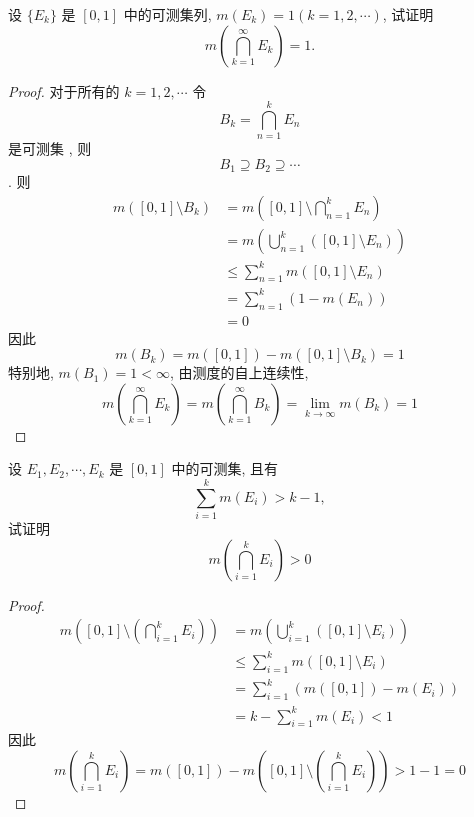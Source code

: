 \documentclass[../main.tex]{subfiles}
\begin{document}
\begin{exercise}{}{}
设 $\{E_k\}$ 是 $[0,1]$ 中的可测集列, $m(E_k)=1 (k=1,2,\cdots)$, 试证明
\[m\left(\bigcap_{k=1}^{\infty} E_k\right) = 1.\]
\end{exercise}
\begin{proof}
   对于所有的 \(  k= 1,2,\cdots   \)  令 \[
    B_{k}= \bigcap _{n = 1}^{k}E_{n}
    \]是可测集 , 则 \[
    B_{1}\supseteq B_2\supseteq \cdots 
    \]. 则 \[
   \begin{aligned}
    m\left( \left[ 0,1 \right]\setminus B_{k}  \right)&= m\left( \left[ 0,1 \right]\setminus \bigcap _{n = 1}^{k}E_{n}  \right)\\ 
     &= m\left( \bigcup _{n = 1}^{k}\left( \left[ 0,1 \right]\setminus E_{n}  \right)  \right)\\ 
      &\le \sum _{n = 1}^{k}m\left( \left[ 0,1 \right]\setminus E_{n}  \right)\\ 
       &= \sum _{n = 1}^{k}\left( 1-m\left( E_{n} \right)  \right)\\ 
        &= 0      
   \end{aligned}
    \]因此 \[
    m\left( B_{k} \right)= m\left( \left[ 0,1 \right]  \right)-m\left( \left[ 0,1 \right]\setminus B_{k}  \right)= 1   
    \]特别地, \(  m\left( B_{1} \right)= 1< \infty   \), 由测度的自上连续性,  \[
    m\left(\bigcap _{k = 1}^{\infty}E_{k} \right)= m\left( \bigcap _{k = 1}^{\infty}B_{k} \right)  = \lim_{k\to \infty}m\left( B_{k} \right)= 1 
    \] 
\end{proof}
\begin{exercise}{}{}
设 $E_1, E_2, \cdots, E_k$ 是 $[0,1]$ 中的可测集, 且有
\[\sum_{i=1}^{k} m(E_i) > k-1,\]
试证明 \[
m\left( \bigcap _{i= 1}^{k}E_{i} \right)> 0 
\]
\end{exercise}
\begin{proof}

 \[
    \begin{aligned}
    m\left( \left[ 0,1 \right]\setminus \left( \bigcap _{i= 1}^{k}E_{i} \right)   \right)&= m\left( \bigcup _{i= 1}^{k}\left( \left[ 0,1 \right]\setminus E_{i}  \right)  \right)   \\ 
     &\le \sum _{i= 1}^{k}m\left( \left[ 0,1 \right]\setminus E_{i}  \right) \\ 
      &= \sum _{i= 1}^{k}\left( m\left( \left[ 0,1 \right]  \right) -m\left( E_{i} \right)  \right) \\ 
       &= k-\sum _{i= 1}^{k}m\left( E_{i} \right) < 1
    \end{aligned}
    \]因此 \[
    m\left( \bigcap _{i= 1}^{k}E_{i} \right)= m\left( \left[ 0,1 \right]  \right)-m\left( \left[ 0,1 \right]\setminus \left( \bigcap _{i= 1}^{k}E_{i} \right)   \right)> 1-1= 0   
    \]
\end{proof}
\end{document}
